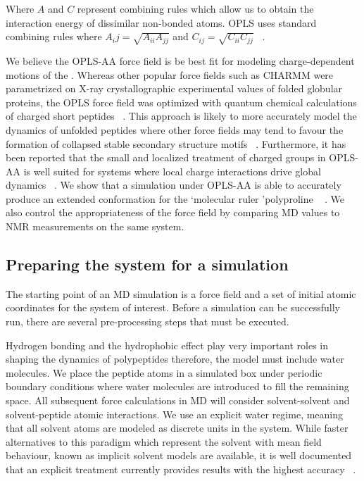 Where $A$ and $C$ represent combining rules which allow us to obtain the interaction energy of dissimilar non-bonded atoms. OPLS uses standard combining rules where $A_ij = \sqrt{A_{ii}A_{jj}}$ and $C_{ij} = \sqrt{C_{ii}C_{jj}}$ ~\cite{good1970new}.

We believe the OPLS-AA force field is be best fit for modeling charge-dependent motions of the \gct. Whereas other popular force fields such as CHARMM were parametrized on X-ray crystallographic experimental values of folded globular proteins, the OPLS force field was optimized with quantum chemical calculations of charged short peptides ~\cite{kukol2008molecular}. This approach is likely to more accurately model the dynamics of unfolded peptides where other force fields may tend to favour the formation of collapsed stable secondary structure motifs ~\cite{henriques2015molecular, tran2008role}. Furthermore, it has been reported that the small and localized treatment of charged groups in OPLS-AA is well suited for systems where local charge interactions drive global dynamics ~\cite{vitalis2009absinth}. We show that a simulation under OPLS-AA is able to accurately produce an extended conformation for the \lq molecular ruler \rq polyproline ~\cite{schuler2005polyproline} . We also control the appropriateness of the force field by comparing MD values to NMR measurements on the same system.

\subsection{Preparing the system for a simulation}

The starting point of an MD simulation is a force field and a set of initial atomic coordinates for the system of interest. Before a simulation can be successfully run, there are several pre-processing steps that must be executed. 

Hydrogen bonding and the hydrophobic effect play very important roles in shaping the dynamics of polypeptides therefore, the model must include water molecules. We place the peptide atoms in a simulated box under periodic boundary conditions where water molecules are introduced to fill the remaining space. All subsequent force calculations in MD will consider solvent-solvent and solvent-peptide atomic interactions. We use an explicit water regime, meaning that all solvent atoms are modeled as discrete units in the system. While faster alternatives to this paradigm which represent the solvent with mean field behaviour, known as implicit solvent models are available, it is well documented that an explicit treatment currently provides results with the highest accuracy ~\cite{onufriev2008implicit, arnold1994evaluation, zhou2003free}. 

